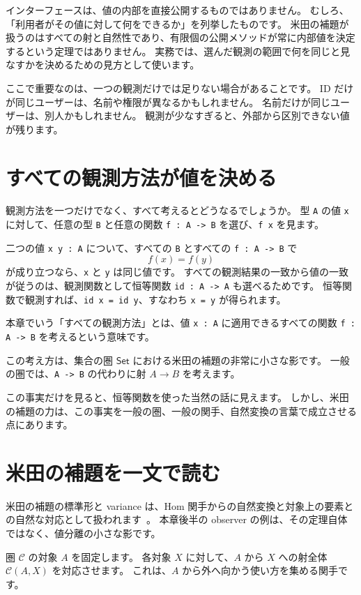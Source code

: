 インターフェースは、値の内部を直接公開するものではありません。
むしろ、「利用者がその値に対して何をできるか」を列挙したものです。
米田の補題が扱うのはすべての射と自然性であり、有限個の公開メソッドが常に内部値を決定するという定理ではありません。
実務では、選んだ観測の範囲で何を同じと見なすかを決めるための見方として使います。

ここで重要なのは、一つの観測だけでは足りない場合があることです。
ID だけが同じユーザーは、名前や権限が異なるかもしれません。
名前だけが同じユーザーは、別人かもしれません。
観測が少なすぎると、外部から区別できない値が残ります。

\section{すべての観測方法が値を決める}

観測方法を一つだけでなく、すべて考えるとどうなるでしょうか。
型 \texttt{A} の値 \texttt{x} に対して、任意の型 \texttt{B} と任意の関数 \texttt{f : A -> B} を選び、\texttt{f x} を見ます。

二つの値 \texttt{x y : A} について、すべての \texttt{B} とすべての \texttt{f : A -> B} で
\[
  f(x) = f(y)
\]
が成り立つなら、\texttt{x} と \texttt{y} は同じ値です。
すべての観測結果の一致から値の一致が従うのは、観測関数として恒等関数 \texttt{id : A -> A} も選べるためです。
恒等関数で観測すれば、\texttt{id x = id y}、すなわち \texttt{x = y} が得られます。

本章でいう「すべての観測方法」とは、値 \texttt{x : A} に適用できるすべての関数 \texttt{f : A -> B} を考えるという意味です。

この考え方は、集合の圏 \(\mathsf{Set}\) における米田の補題の非常に小さな影です。
一般の圏では、\texttt{A -> B} の代わりに射 \(A \to B\) を考えます。

この事実だけを見ると、恒等関数を使った当然の話に見えます。
しかし、米田の補題の力は、この事実を一般の圏、一般の関手、自然変換の言葉で成立させる点にあります。

\section{米田の補題を一文で読む}

米田の補題の標準形と variance は、Hom 関手からの自然変換と対象上の要素との自然な対応として扱われます~\cite{riehl-category-theory-in-context}。
本章後半の observer の例は、その定理自体ではなく、値分離の小さな影です。

圏 \(\mathcal{C}\) の対象 \(A\) を固定します。
各対象 \(X\) に対して、\(A\) から \(X\) への射全体 \(\mathcal{C}(A,X)\) を対応させます。
これは、\(A\) から外へ向かう使い方を集める関手です。

